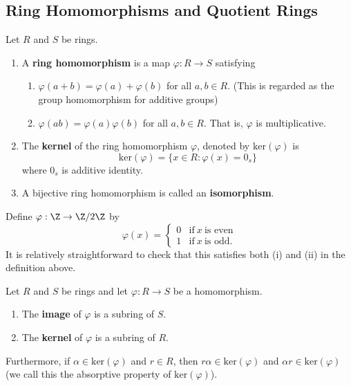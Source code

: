 \subsection{Ring Homomorphisms and Quotient Rings}

\begin{definition}
    Let \( R  \) and \( S  \) be rings. 
    \begin{enumerate}
        \item[(1)] A \textbf{ring homomorphism} is a map \( \varphi: R \to S  \) satisfying
            \begin{enumerate}
                \item[(i)] \( \varphi(a + b) = \varphi(a) + \varphi(b) \) for all \( a,b \in R  \). (This is regarded as the group homomorphism for additive groups)
                \item[(ii)] \( \varphi(ab) = \varphi(a) \varphi(b) \) for all \( a,b\in R  \). That is, \( \varphi \) is multiplicative.
            \end{enumerate}
        \item[(2)] The \textbf{kernel} of the ring homomorphism \( \varphi \), denoted by \( \text{ker}(\varphi)  \) is
            \[  \text{ker}(\varphi)  = \{ x \in R : \varphi(x) = {0}_{s} \}  \]
            where \( {0}_{s} \) is additive identity. 
        \item[(3)] A bijective ring homomorphism is called an \textbf{isomorphism}.
    \end{enumerate}
\end{definition}

\begin{eg}
    Define \( \varphi: \Z \to \Z / 2 \Z  \) by 
    \[  \varphi(x) = 
    \begin{cases}
        0 &\text{if} \ x \ \text{is even} \\
        1 &\text{if} \  x \ \text{is odd}.
    \end{cases} \]
    It is relatively straightforward to check that this satisfies both (i) and (ii) in the definition above.
\end{eg}

\begin{prop}
   Let \( R  \) and \( S  \) be rings and let \( \varphi: R \to S  \) be a homomorphism. 
   \begin{enumerate}
       \item[(1)] The \textbf{image} of \( \varphi  \) is a subring of \( S  \).
       \item[(2)] The \textbf{kernel} of \( \varphi  \) is a subring of \( R  \).
   \end{enumerate}
   Furthermore, if \( \alpha \in \text{ker}(\varphi)  \) and \( r \in R  \), then \( r \alpha \in \text{ker}(\varphi)  \) and \( \alpha r \in \text{ker}(\varphi)  \) (we call this the absorptive property of \( \text{ker}(\varphi)  \)).
\end{prop}

